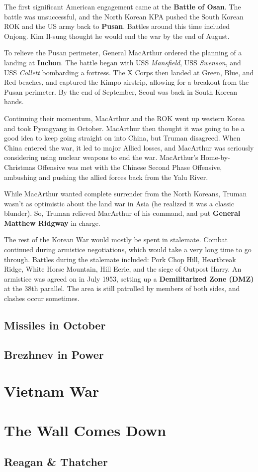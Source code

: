 The first significant American engagement came at the \textbf{Battle of Osan}.
The battle was unsuccessful,
and the North Korean KPA pushed the South Korean ROK and the US army back to \textbf{Pusan}.
Battles around this time included Onjong.
Kim Il-sung thought he would end the war by the end of August.

To relieve the Pusan perimeter, General MacArthur ordered the planning of a landing at \textbf{Inchon}.
The battle began with USS \textit{Mansfield}, USS \textit{Swenson}, and USS \textit{Collett} bombarding a fortress.
The X Corps then landed at Green, Blue, and Red beaches, and captured the Kimpo airstrip,
allowing for a breakout from the Pusan perimeter.
By the end of September, Seoul was back in South Korean hands.

Continuing their momentum, MacArthur and the ROK went up western Korea and took Pyongyang in October.
MacArthur then thought it was going to be a good idea to keep going straight on into China, but Truman disagreed.
When China entered the war, it led to major Allied losses,
and MacArthur was seriously considering using nuclear weapons to end the war.
MacArthur's Home-by-Christmas Offensive was met with the Chinese Second Phase Offensive,
ambushing and pushing the allied forces back from the Yalu River.

While MacArthur wanted complete surrender from the North Koreans,
Truman wasn't as optimistic about the land war in Asia (he realized it was a classic blunder).
So, Truman relieved MacArthur of his command, and put \textbf{General Matthew Ridgway} in charge.

The rest of the Korean War would mostly be spent in stalemate.
Combat continued during armistice negotiations, which would take a very long time to go through.
Battles during the stalemate included:
Pork Chop Hill,
Heartbreak Ridge,
White Horse Mountain,
Hill Eerie,
and the siege of Outpost Harry.
An armistice was agreed on in July 1953, setting up a \textbf{Demilitarized Zone (DMZ)} at the 38th parallel.
The area is still patrolled by members of both sides, and clashes occur sometimes.

\subsection*{Missiles in October}

\subsection*{Brezhnev in Power}

\section{Vietnam War}

\section{The Wall Comes Down}

\subsection*{Reagan \& Thatcher}

